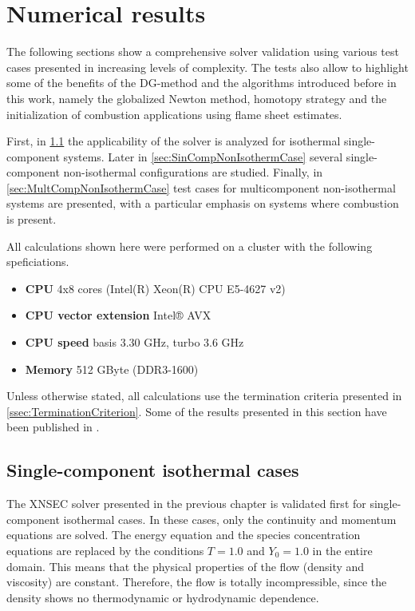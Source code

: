 \chapter{Numerical results}	\label{ch:results}
The following sections show a comprehensive solver validation using various test cases presented in increasing levels of complexity. The tests also allow to highlight some of the benefits of the DG-method and the algorithms introduced before in this work, namely the globalized Newton method, homotopy strategy and the initialization of combustion applications using flame sheet estimates. 

First, in \cref{sec:SingleCompIsotCase} the applicability of the solver is analyzed for isothermal single-component systems. Later in \cref{sec:SinCompNonIsothermCase} several single-component non-isothermal configurations are studied. Finally, in \cref{sec:MultCompNonIsothermCase} test cases for multicomponent non-isothermal systems are presented, with a particular emphasis on systems where combustion is present.

All calculations shown here were performed on a cluster with the following speficiations.
\begin{itemize}
    \item \textbf{CPU} 4x8 cores (Intel(R) Xeon(R) CPU E5-4627 v2)
    \item \textbf{CPU vector extension} Intel® AVX
    \item \textbf{CPU speed} basis 3.30 GHz, turbo 3.6 GHz
    \item \textbf{Memory} 512 GByte (DDR3-1600)
\end{itemize}
Unless otherwise stated, all calculations use the termination criteria presented in \cref{ssec:TerminationCriterion}.
Some of the results presented in this section have been published in \parencite{gutierrez-jorqueraFullyCoupledHighorder2022}.
\section{Single-component isothermal cases}\label{sec:SingleCompIsotCase}
The XNSEC solver presented in the previous chapter is validated first for single-component isothermal cases. In these cases, only the continuity and momentum equations are solved. The energy equation and the species concentration equations are replaced by the conditions $T = 1.0$ and $Y_0 = 1.0$ in the entire domain. This means that the physical properties of the flow (density and viscosity) are constant. Therefore, the flow is totally incompressible, since the density shows no thermodynamic or hydrodynamic dependence.


